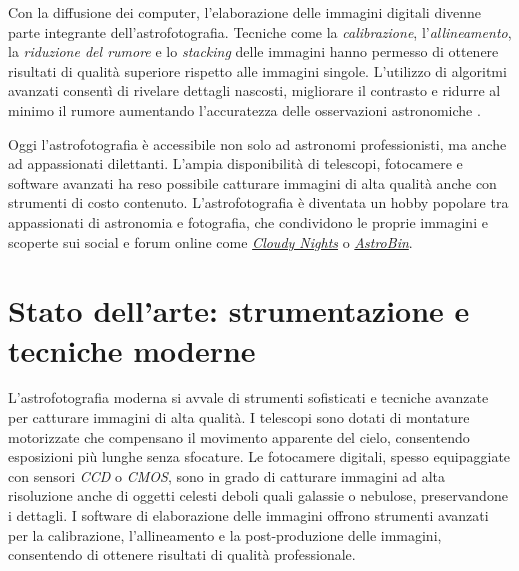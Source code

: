 Con la diffusione dei computer, l'elaborazione delle immagini digitali divenne parte integrante dell'astrofotografia. Tecniche come la \textit{calibrazione}, l'\textit{allineamento}, la \textit{riduzione del rumore} e lo \textit{stacking} delle immagini hanno permesso di ottenere risultati di qualità superiore rispetto alle immagini singole. L'utilizzo di algoritmi avanzati consentì di rivelare dettagli nascosti, migliorare il  contrasto e ridurre al minimo il rumore aumentando l'accuratezza delle osservazioni astronomiche \cite{calibration_1}\cite{calibration_2}.

Oggi l'astrofotografia è accessibile non solo ad astronomi professionisti, ma anche ad appassionati dilettanti. L'ampia disponibilità di telescopi, fotocamere e software avanzati ha reso possibile catturare immagini di alta qualità anche con strumenti di costo contenuto. L'astrofotografia è diventata un hobby popolare tra appassionati di astronomia e fotografia, che condividono le proprie immagini e scoperte sui social e forum online come \textit{\href{https://www.cloudynights.com/index}{Cloudy Nights}} o \textit{\href{https://www.astrobin.com}{AstroBin}}.

\section{Stato dell'arte: strumentazione e tecniche moderne} \label{state_of_the_art}

L'astrofotografia moderna si avvale di strumenti sofisticati e tecniche avanzate per catturare immagini di alta qualità. I telescopi sono dotati di montature motorizzate che compensano il movimento apparente del cielo, consentendo esposizioni più lunghe senza sfocature. Le fotocamere digitali, spesso equipaggiate con sensori \textit{CCD} o \textit{CMOS}, sono in grado di catturare immagini ad alta risoluzione anche di oggetti celesti deboli quali galassie o nebulose, preservandone i dettagli. I software di elaborazione delle immagini offrono strumenti avanzati per la calibrazione, l'allineamento e la post-produzione delle immagini, consentendo di ottenere risultati di qualità professionale.

